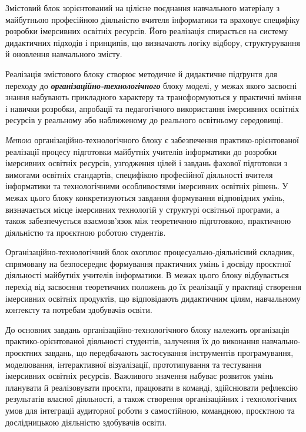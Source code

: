 Змістовий блок зорієнтований на цілісне поєднання навчального матеріалу з майбутньою професійною діяльністю вчителя інформатики та враховує специфіку розробки імерсивних освітніх ресурсів. Його реалізація спирається на систему дидактичних підходів і принципів, що визначають логіку відбору, структурування й оновлення навчального змісту.

Реалізація змістового блоку створює методичне й дидактичне підґрунтя для переходу до \emph{\textbf{організаційно-технологічного}} блоку моделі, у межах якого засвоєні знання набувають прикладного характеру та трансформуються у практичні вміння і навички розробки, апробації та педагогічного використання імерсивних освітніх ресурсів у реальному або наближеному до реального освітньому середовищі.

\emph{Метою} організаційно-технологічного блоку є забезпечення практико-орієнтованої реалізації процесу підготовки майбутніх учителів інформатики до розробки імерсивних освітніх ресурсів, узгодження цілей і завдань фахової підготовки з вимогами освітніх стандартів, специфікою професійної діяльності вчителя інформатики та технологічними особливостями імерсивних освітніх рішень. У межах цього блоку конкретизуються завдання формування відповідних умінь, визначається місце імерсивних технологій у структурі освітньої програми, а також забезпечується взаємозв'язок між теоретичною підготовкою, практичною діяльністю та проєктною роботою студентів.

Організаційно-технологічний блок охоплює процесуально-діяльнісний складник, спрямовану на безпосереднє формування практичних умінь і досвіду проєктної діяльності майбутніх учителів інформатики. В межах цього блоку відбувається перехід від засвоєння теоретичних положень до їх реалізації у практиці створення імерсивних освітніх продуктів, що відповідають дидактичним цілям, навчальному контексту та потребам здобувачів освіти.

До основних завдань організаційно-технологічного блоку належить організація практико-орієнтованої діяльності студентів, залучення їх до виконання навчально-проєктних завдань, що передбачають застосування інструментів програмування, моделювання, інтерактивної візуалізації, прототипування та тестування імерсивних освітніх ресурсів. Важливого значення набуває розвиток умінь планувати й реалізовувати проєкти, працювати в команді, здійснювати рефлексію результатів власної діяльності, а також створення організаційних і технологічних умов для інтеграції аудиторної роботи з самостійною, командною, проєктною та дослідницькою діяльністю здобувачів освіти.

